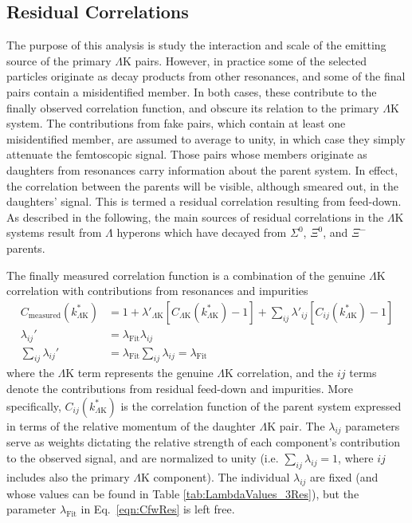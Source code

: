 \documentclass[ALICE,manyauthors]{cernphprep}
\newcommand{\Lam}{$\Lambda$\xspace}
\newcommand{\LamK}{$\Lambda$K\xspace}
\begin{document}
\subsection{Residual Correlations}
\label{ResidualCorrelations}

The purpose of this analysis is study the interaction and scale of the emitting source of the primary \LamK pairs.
However, in practice some of the selected particles originate as decay products from other resonances, and some of the final pairs contain a misidentified member.
In both cases, these contribute to the finally observed correlation function, and obscure its relation to the primary \LamK system.
The contributions from fake pairs, which contain at least one misidentified member, are assumed to average to unity, in which case they simply attenuate the femtoscopic signal.
Those pairs whose members originate as daughters from resonances carry information about the parent system.
In effect, the correlation between the parents will be visible, although smeared out, in the daughters' signal.
This is termed a residual correlation resulting from feed-down.  
As described in the following, the main sources of residual correlations in the \LamK systems result from \Lam hyperons which have decayed from $\Sigma^{0}$, $\Xi^{0}$, and $\Xi^{-}$ parents.

The finally measured correlation function is a combination of the genuine \LamK correlation with contributions from resonances and impurities
\begin{equation}
\begin{aligned}
\label{eqn:CfwRes} 
 C_{\mathrm{measured}}(k^{*}_{\Lambda\mathrm{K}}) &= 1 + \lambda'_{\Lambda\mathrm{K}}[C_{\Lambda\mathrm{K}}(k^{*}_{\Lambda\mathrm{K}}) - 1] + \sum\limits_{ij}  \lambda'_{ij}[C_{ij}(k^{*}_{\Lambda\mathrm{K}})-1] \\
 \lambda_{ij}' &= \lambda_{\mathrm{Fit}}\lambda_{ij} \\
 \sum\limits_{ij}\lambda_{ij}' &=  \lambda_{\mathrm{Fit}}\sum\limits_{ij}\lambda_{ij} = \lambda_{\mathrm{Fit}}
\end{aligned} 
\end{equation}
where the \LamK term represents the genuine \LamK correlation, and the $ij$ terms denote the contributions from residual feed-down and impurities.
More specifically, $C_{ij}(k^{*}_{\Lambda\mathrm{K}})$ is the correlation function of the parent system expressed in terms of the relative momentum of the daughter \LamK pair.  
The $\lambda_{ij}$ parameters serve as weights dictating the relative strength of each component's contribution to the observed signal, and are normalized to unity (i.e. $\sum_{ij} \lambda_{ij} = 1$, where $ij$ includes also the primary \LamK component).
The individual $\lambda_{ij}$ are fixed (and whose values can be found in Table \ref{tab:LambdaValues_3Res}), but the parameter $\lambda_{\mathrm{Fit}}$ in Eq.\ \ref{eqn:CfwRes} is left free.
\end{document}
